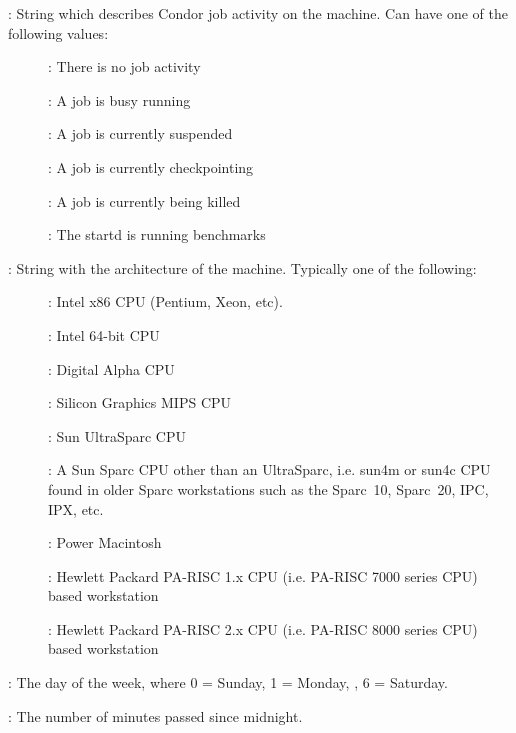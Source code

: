 \begin{description}
%
\item[\AdAttr{Activity}] : String which describes Condor job activity on the machine.
Can have one of the following values:
	\begin{description}
	\item[] : There is no job activity
	\item[] : A job is busy running
	\item[] : A job is currently suspended
	\item[] : A job is currently checkpointing
	\item[] : A job is currently being killed
	\item[] : The startd is running benchmarks
	\end{description}
%
\item[\AdAttr{Arch}] : String with the architecture of the machine.  Typically
one of the following: 
	\begin{description}
	\item[] : Intel x86 CPU (Pentium, Xeon, etc).
	\item[] : Intel 64-bit CPU
	\item[] : Digital Alpha CPU
	\item[] : Silicon Graphics MIPS CPU
	\item[] : Sun UltraSparc CPU
	\item[] : A Sun Sparc CPU other than an UltraSparc, i.e.
sun4m or sun4c CPU found in older Sparc workstations such as the Sparc~10, 
Sparc~20, IPC, IPX, etc.
	\item[] : Power Macintosh
	\item[] :  Hewlett Packard PA-RISC 1.x CPU (i.e. PA-RISC    
                      7000 series CPU) based workstation
	\item[] :  Hewlett Packard PA-RISC 2.x CPU (i.e. PA-RISC    
                      8000 series CPU) based workstation
	\end{description}
%
\item[\AdAttr{ClockDay}] : The day of the week, where 0 = Sunday, 1 = Monday, \Dots, 6 = Saturday. 
%
\item[\AdAttr{ClockMin}] : The number of minutes passed since midnight.

\end{description}
